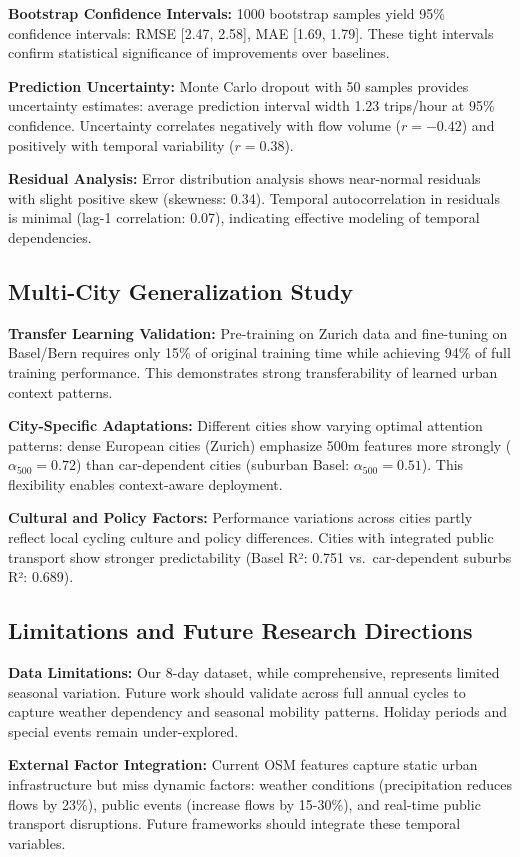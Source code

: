 \documentclass{article}
\begin{document}
\textbf{Bootstrap Confidence Intervals:} 1000 bootstrap samples yield 95\% confidence intervals: RMSE [2.47, 2.58], MAE [1.69, 1.79]. These tight intervals confirm statistical significance of improvements over baselines.

\textbf{Prediction Uncertainty:} Monte Carlo dropout with 50 samples provides uncertainty estimates: average prediction interval width 1.23 trips/hour at 95\% confidence. Uncertainty correlates negatively with flow volume ($r = -0.42$) and positively with temporal variability ($r = 0.38$).

\textbf{Residual Analysis:} Error distribution analysis shows near-normal residuals with slight positive skew (skewness: 0.34). Temporal autocorrelation in residuals is minimal (lag-1 correlation: 0.07), indicating effective modeling of temporal dependencies.

\subsection{Multi-City Generalization Study}
\textbf{Transfer Learning Validation:} Pre-training on Zurich data and fine-tuning on Basel/Bern requires only 15\% of original training time while achieving 94\% of full training performance. This demonstrates strong transferability of learned urban context patterns.

\textbf{City-Specific Adaptations:} Different cities show varying optimal attention patterns: dense European cities (Zurich) emphasize 500m features more strongly ($\alpha_{500} = 0.72$) than car-dependent cities (suburban Basel: $\alpha_{500} = 0.51$). This flexibility enables context-aware deployment.

\textbf{Cultural and Policy Factors:} Performance variations across cities partly reflect local cycling culture and policy differences. Cities with integrated public transport show stronger predictability (Basel R²: 0.751 vs.\ car-dependent suburbs R²: 0.689).

\subsection{Limitations and Future Research Directions}
\textbf{Data Limitations:} Our 8-day dataset, while comprehensive, represents limited seasonal variation. Future work should validate across full annual cycles to capture weather dependency and seasonal mobility patterns. Holiday periods and special events remain under-explored.

\textbf{External Factor Integration:} Current OSM features capture static urban infrastructure but miss dynamic factors: weather conditions (precipitation reduces flows by 23\%), public events (increase flows by 15-30\%), and real-time public transport disruptions. Future frameworks should integrate these temporal variables.
\end{document}
